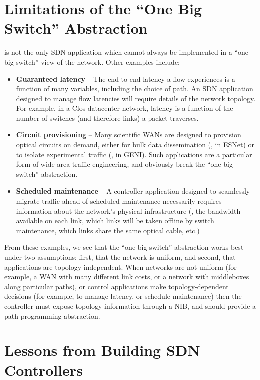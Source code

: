 \section{Limitations of the ``One Big Switch'' Abstraction}
\label{sec:one-big-switch}

\sys is not the only SDN application which cannot always be implemented in a ``one big switch''
view of the network. Other examples include:

\begin{itemize}
\item {\bf Guaranteed latency} -- The end-to-end latency a flow experiences is a function of
many variables, including the choice of path. An SDN application designed to manage flow
latencies will require details of the network topology. For example, in a Clos datacenter network,
latency is a function of the number of switches (and therefore links) a packet traverses.

\item {\bf Circuit provisioning} -- Many scientific WANs are designed to provision optical circuits
on demand, either for bulk data dissemination (\eg, in ESNet) or to isolate experimental traffic
(\eg, in GENI). Such applications are a particular form of wide-area traffic engineering, and
obviously break the ``one big switch'' abstraction.

\item {\bf Scheduled maintenance} -- A controller application designed to seamlessly migrate
traffic ahead of scheduled maintenance necessarily requires information about the network's
physical infrastructure (\eg, the bandwidth available on each link, which links will be taken
offline by switch maintenance, which links share the same optical cable, etc.)
\end{itemize}

From these examples, we see that the ``one big switch'' abstraction works best under two
assumptions: first, that the network is uniform, and second, that applications are topology-independent.
When networks are not uniform (for example, a WAN with many different link costs,
or a network with middleboxes along particular paths), or control applications
make topology-dependent decisions (for example, to manage latency, or schedule maintenance) then
the controller must expose topology information through a NIB, and should provide a path
programming abstraction.

\section{Lessons from Building SDN Controllers}
\label{sec:building-controllers}

